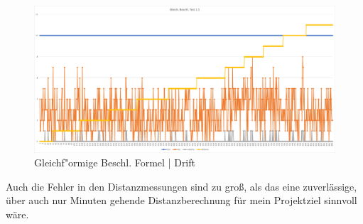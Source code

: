     \begin{figure} [h]
        \centering
        \includegraphics[width = 15cm]{Bilder/_constDistance001}
        \caption{Gleichf"ormige Beschl. Formel | Drift}
        \end{figure}
    
Auch die Fehler in den Distanzmessungen sind zu groß, als das 
eine zuverlässige, über auch nur Minuten gehende Distanzberechnung für mein Projektziel sinnvoll wäre.